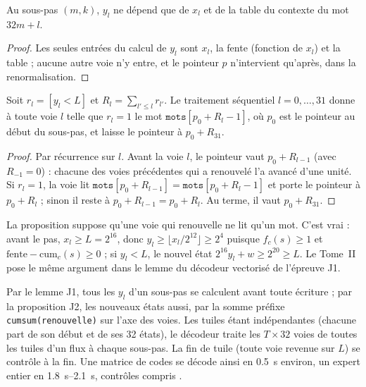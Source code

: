 \begin{lemme}\label{t3jug:lem:j1}
Au sous-pas $(m, k)$, $y_l$ ne dépend que de $x_l$ et de la table du contexte du mot $32m + l$.
\end{lemme}
\begin{proof}
Les seules entrées du calcul de $y_l$ sont $x_l$, la fente (fonction de $x_l$) et la table ; aucune autre voie n'y entre, et le pointeur $p$ n'intervient qu'après, dans la renormalisation.
\end{proof}

\begin{proposition}\label{t3jug:prop:j2}
Soit $r_l = [y_l < L]$ et $R_l = \sum_{l' \le l} r_{l'}$. Le traitement séquentiel $l = 0, \dots, 31$ donne à toute voie $l$ telle que $r_l = 1$ le mot $\texttt{mots}[p_0 + R_l - 1]$, où $p_0$ est le pointeur au début du sous-pas, et laisse le pointeur à $p_0 + R_{31}$.
\end{proposition}
\begin{proof}
Par récurrence sur $l$. Avant la voie $l$, le pointeur vaut $p_0 + R_{l-1}$ (avec $R_{-1} = 0$) : chacune des voies précédentes qui a renouvelé l'a avancé d'une unité. Si $r_l = 1$, la voie lit $\texttt{mots}[p_0 + R_{l-1}] = \texttt{mots}[p_0 + R_l - 1]$ et porte le pointeur à $p_0 + R_l$ ; sinon il reste à $p_0 + R_{l-1} = p_0 + R_l$. Au terme, il vaut $p_0 + R_{31}$.
\end{proof}

\begin{remarque}
La proposition suppose qu'une voie qui renouvelle ne lit qu'un mot. C'est vrai : avant le pas, $x_l \ge L = 2^{16}$, donc $y_l \ge \lfloor x_l / 2^{12}\rfloor \ge 2^{4}$ puisque $f_c(s) \ge 1$ et $\text{fente} - \mathrm{cum}_c(s) \ge 0$ ; si $y_l < L$, le nouvel état $2^{16} y_l + w \ge 2^{20} \ge L$. Le Tome~II pose le même argument dans le lemme du décodeur vectorisé de l'épreuve J1.
\end{remarque}

Par le lemme J1, tous les $y_l$ d'un sous-pas se calculent avant toute écriture ; par la proposition J2, les nouveaux états aussi, par la somme préfixe \texttt{cumsum(renouvelle)} sur l'axe des voies. Les tuiles étant indépendantes (chacune part de son début et de ses 32 états), le décodeur traite les $T \times 32$ voies de toutes les tuiles d'un flux à chaque sous-pas. La fin de tuile (toute voie revenue sur $L$) se contrôle à la fin. Une matrice de codes se décode ainsi en \SI{0.5}{\second} environ, un expert entier en \SIrange{1.8}{2.1}{\second}, contrôles compris \mes.

